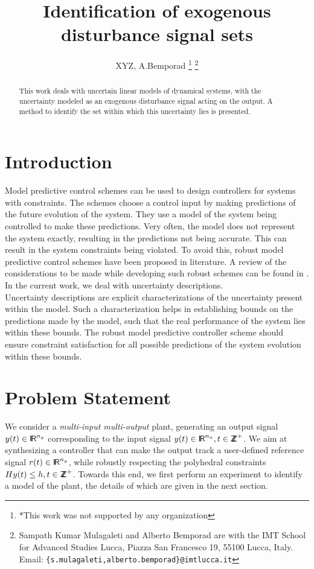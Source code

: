 \documentclass[letterpaper, 10 pt, conference]{ieeeconf}  %
\title{\LARGE \bf
Identification of exogenous disturbance signal sets
}
\author{XYZ, A.Bemporad%
\thanks{*This work was not supported by any organization}%
\thanks{Sampath Kumar Mulagaleti and Alberto Bemporad are with
		the IMT School for Advanced Studies Lucca, Piazza San Francesco 19,
		55100 Lucca, Italy. 
		 Email: 
	   {\tt\small \{s.mulagaleti,alberto.bemporad\}@imtlucca.it}}%
}
\newcommand*{\RR}{%
	\textsf{I\kern-.3ex R}%
}
\newcommand*{\ZZ}{%
	\textsf{Z\kern-1ex Z}%
}
\begin{document}
\maketitle
\thispagestyle{empty}
\pagestyle{empty}


\begin{abstract}

This work deals with uncertain linear models of dynamical systems, with the uncertainty modeled as an exogenous disturbance signal acting on the output. A method to identify the set within which this uncertainty lies is presented. 

\end{abstract}


\section{Introduction}
Model predictive control schemes can be used to design controllers for systems with constraints. The schemes choose a control input by making predictions of the future evolution of the system. They use a model of the system being controlled to make these predictions. Very often, the model does not represent the system exactly, resulting in the predictions not being accurate. This can result in the system constraints being violated. To avoid this, robust model predictive control schemes have been proposed in literature. A review of the considerations to be made while developing such robust schemes can be found in \cite{10.1007/BFb0109870}. In the current work, we deal with uncertainty descriptions.  
 \\ \indent
 Uncertainty descriptions are explicit characterizations of the uncertainty present within the model. Such a characterization helps in establishing bounds on the predictions made by the model, such that the real performance of the system lies within these bounds. The robust model predictive controller scheme should ensure constraint satisfaction for all possible predictions of the system evolution within these bounds.  
 
\section{Problem Statement}
We consider a \textit{multi-input multi-output} plant, generating an output signal $y(t) \in  \RR^{n_y}$ corresponding to the input signal $y(t) \in\RR^{n_u}, t \in \ZZ^+$. We aim at synthesizing a controller that can make the output track a user-defined reference signal $r(t) \in  \RR^{n_y}$, while robustly respecting the polyhedral constraints $Hy(t) \leq h , t \in \ZZ^+$. Towards this end, we first perform an experiment to identify a model of the plant, the details of which are given in the next section. 
\end{document}
